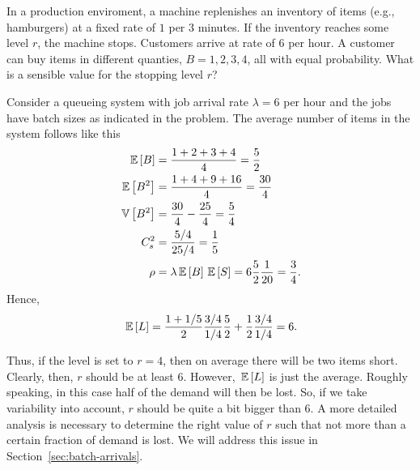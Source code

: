 \begin{question}
  In a production enviroment, a machine replenishes an inventory of
  items (e.g., hamburgers) at a fixed rate of $1$ per 3 minutes. If
  the inventory reaches some level $r$, the machine stops.  Customers
  arrive at rate of 6 per hour. A customer can buy items in different
  quanties, $B=1,2,3,4$, all with equal probability. What is a
  sensible value for the stopping level $r$?  

  \begin{solution}
    Consider a queueing system with job arrival rate $\lambda=6$ per
    hour and the jobs have batch sizes as indicated in the
    problem. The average number of items in the system  follows like this
    \begin{align*}
      \,\mathbb{E}\left[B\right] &= \frac{1+2+3+4}{4} = \frac 52 \\
      \,\mathbb{E}\left[B^2\right] &= \frac{1+4+9+16}{4} = \frac{30}4\\
      \,\mathbb{V}\left[B^2\right] &= \frac{30}4 - \frac{25}4 = \frac 5 4\\
      C_s^2 &= \frac{5/4}{25/4} = \frac 15\\
      \rho &= \lambda \,\mathbb{E}\left[B\right] \,\mathbb{E}\left[S\right] = 6 \frac 52 \frac 1{20} = \frac 34.
    \end{align*}
Hence, 
\begin{equation*}
  \,\mathbb{E}\left[L\right] = \frac {1+1/5}2 \frac{3/4}{1/4} \frac 52 + \frac 12 \frac{3/4}{1/4} = 6.
\end{equation*}

Thus, if the level is set to $r=4$, then on average there will be two
items short. Clearly, then, $r$ should be at least $6$. However,
$\,\mathbb{E}\left[L\right]$ is just the average. Roughly speaking, in this case half of
the demand will then be lost. So, if we take variability into account,
$r$ should be quite a bit bigger than 6. A more detailed analysis is
necessary to determine the right value of $r$ such that not more than
a certain fraction of demand is lost. We will address this issue in
Section~\ref{sec:batch-arrivals}.

    
  \end{solution}
\end{question}

